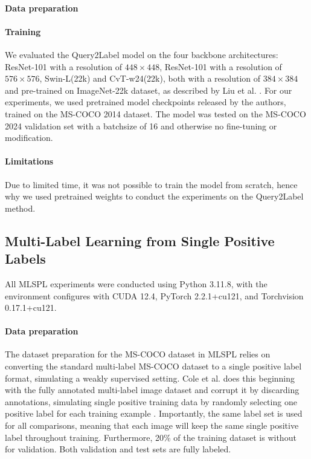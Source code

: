 \documentclass[lettersize,journal]{IEEEtran}
\begin{document}
\paragraph{Data preparation}

\paragraph{Training}
We evaluated the Query2Label model on the four backbone architectures: ResNet-101 with a resolution of $448\times 448$, ResNet-101 with a resolution of $576\times 576$, Swin-L(22k) and CvT-w24(22k), both with a resolution of $384\times 384$ and pre-trained on ImageNet-22k \cite{imagenet} dataset, as described by Liu et al. \cite{Query2Label}. For our experiments, we used pretrained model checkpoints released by the authors, trained on the MS-COCO 2014 dataset. The model was tested on the MS-COCO 2024 validation set with a batchsize of 16 and otherwise no fine-tuning or modification.

\paragraph{Limitations}
Due to limited time, it was not possible to train the model from scratch, hence why we used pretrained weights to conduct the experiments on the Query2Label method.


\subsection{Multi-Label Learning from Single Positive Labels}
All MLSPL experiments were conducted using Python 3.11.8, with the environment configures with CUDA 12.4, PyTorch 2.2.1+cu121, and Torchvision 0.17.1+cu121.

\paragraph{Data preparation}
The dataset preparation for the MS-COCO dataset in MLSPL relies on converting the standard multi-label MS-COCO dataset to a single positive label format, simulating a weakly supervised setting. Cole et al. does this beginning with the fully annotated multi-label image dataset and corrupt it by discarding annotations, simulating single positive training data by randomly selecting one positive label for each training example \cite{mlsp}. Importantly, the same label set is used for all comparisons, meaning that each image will keep the same single positive label throughout training. Furthermore, 20\% of the training dataset is without for validation. Both validation and test sets are fully labeled.
\end{document}

